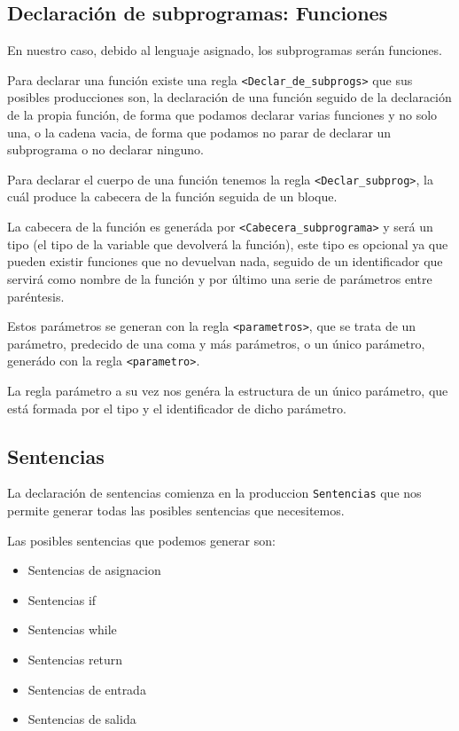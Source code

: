 \documentclass[12pt, spanish]{article}
\begin{document}
\subsection{Declaración de subprogramas: Funciones}

En nuestro caso, debido al lenguaje asignado, los subprogramas serán funciones.

Para declarar una función existe una regla \texttt{<Declar_de_subprogs>} que sus posibles producciones son, la declaración de una función seguido de la declaración de la propia función, de forma que podamos declarar varias funciones y no solo una, o la cadena vacia, de forma que podamos no parar de declarar un subprograma o no declarar ninguno.

Para declarar el cuerpo de una función tenemos la regla \texttt{<Declar\_subprog>}, la cuál produce la cabecera de la función seguida de un bloque.

La cabecera de la función es generáda por \texttt{<Cabecera\_subprograma>} y será un tipo (el tipo de la variable que devolverá la función), este tipo es opcional ya que pueden existir funciones que no devuelvan nada, seguido de un identificador que servirá como nombre de la función y por último una serie de parámetros entre paréntesis.

Estos parámetros se generan con la regla \texttt{<parametros>}, que se trata de un parámetro, predecido de una coma y más parámetros, o un único parámetro, generádo con la regla \texttt{<parametro>}.

La regla parámetro a su vez nos genéra la estructura de un único parámetro, que está formada por el tipo y el identificador de dicho parámetro.

\subsection{Sentencias}

La declaración de sentencias comienza en la produccion \texttt{Sentencias} que nos permite generar todas las posibles sentencias que necesitemos.

Las posibles sentencias que podemos generar son:

\begin{itemize}
    \item{Sentencias de asignacion}
    \item{Sentencias if}
    \item{Sentencias while}
    \item{Sentencias return}
    \item{Sentencias de entrada}
    \item{Sentencias de salida}
\end{itemize}
\end{document}
